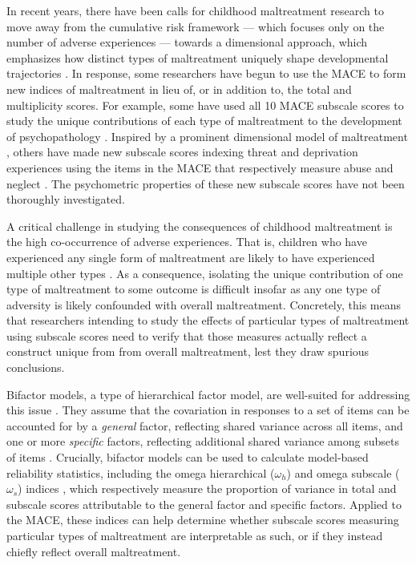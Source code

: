 \documentclass[letterpaper,man,natbib,floatsintext,longtable]{apa6}
\begin{document}
In recent years, there have been calls for childhood maltreatment research to move away from the cumulative risk framework \citep{evans2013cumulative} --- which focuses only on the number of adverse experiences --- towards a dimensional approach, which emphasizes how distinct types of maltreatment uniquely shape developmental trajectories \citep{mclaughlin2016beyond, belsky2012beyond}. In response, some researchers have begun to use the MACE to form new indices of maltreatment in lieu of, or in addition to, the total and multiplicity scores. For example, some have used all 10 MACE subscale scores to study the unique contributions of each type of maltreatment to the development of psychopathology \citep{schalinski2015type, gerke2018childhood, schalinski2019early}. Inspired by a prominent dimensional model of maltreatment \citep{mclaughlin2014childhood}, others have made new subscale scores indexing threat and deprivation experiences using the items in the MACE that respectively measure abuse and neglect \citep{schalinski2018defining, schalinski2019environmental, teicher2018differential}. The psychometric properties of these new subscale scores have not been thoroughly investigated.   

A critical challenge in studying the consequences of childhood maltreatment is the high co-occurrence of adverse experiences. That is, children who have experienced any single form of maltreatment are likely to have experienced multiple other types \citep{dong2004interrelatedness, herrenkohl2009assessing, kessler2010childhood}. As a consequence, isolating the unique contribution of one type of maltreatment to some outcome is difficult insofar as any one type of adversity is likely confounded with overall maltreatment. Concretely, this means that researchers intending to study the effects of particular types of maltreatment using subscale scores need to verify that those measures actually reflect a construct unique from from overall maltreatment, lest they draw spurious conclusions.

Bifactor models, a type of hierarchical factor model, are well-suited for addressing this issue \citep{bornovalova2020appropriate}. They assume that the covariation in responses to a set of items can be accounted for by a \emph{general} factor, reflecting shared variance across all items, and one or more \emph{specific} factors, reflecting additional shared variance among subsets of items \citep{Reise2012-ql}. Crucially, bifactor models can be used to calculate model-based reliability statistics, including the omega hierarchical ($\omega_h$) and omega subscale ($\omega_s$) indices \citep{reise2013scoring}, which respectively measure the proportion of variance in total and subscale scores attributable to the general factor and specific factors. Applied to the MACE, these indices can help determine whether subscale scores measuring particular types of maltreatment are interpretable as such, or if they instead chiefly reflect overall maltreatment. 
\end{document}
